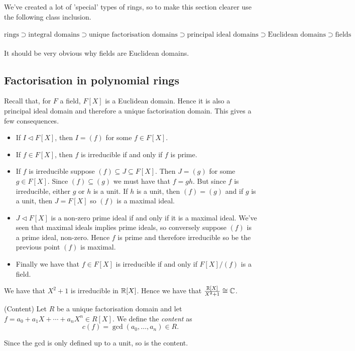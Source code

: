 \documentclass{article}
\newcommand{\nrm}{\triangleleft}
\begin{document}
\begin{itemize}
\\\\ We've created a lot of 'special' types of rings, so to make this section clearer use the following class inclusion.\\\\
$
	\text{rings} \supset \text{integral domains}\supset\text{unique factorisation domains} \supset \text{principal ideal domains}\supset \text{Euclidean domains} \supset \text{fields}
$\\\\
It should be very obvious why fields are Euclidean domains.
\subsection{Factorisation in polynomial rings}
Recall that, for $ F $ a field, $ F[X] $ is a Euclidean domain. Hence it is also a principal ideal domain and therefore a unique factorisation domain. This gives a few consequences.
\begin{itemize}
	\item If $ I\nrm F[X] $, then $ I=(f) $ for some $ f\in F[X] $.
	\item If $ f\in F[X] $, then $ f $ is irreducible if and only if $ f $ is prime.
	\item If $ f $ is irreducible suppose $ (f)\subseteq J\subseteq F[X] $. Then $ J=(g) $ for some $ g\in F[X] $. Since $ (f)\subseteq (g) $ we must have that $ f=gh $. But since $ f $ is irreducible, either $ g $ or $ h $ is a unit. If $ h $ is a unit, then $ (f)=(g) $ and if $ g $ is a unit, then $ J=F[X] $ so $ (f) $ is a maximal ideal.
	\item $ J\nrm F[X] $ is a non-zero prime ideal if and only if it is a maximal ideal. We've seen that maximal ideals implies prime ideals, so conversely suppose $ (f) $ is a prime ideal, non-zero. Hence $ f $ is prime and therefore irreducible so be the previous point $ (f) $ is maximal.
	\item Finally we have that $ f\in F[X] $ is irreducible if and only if $ F[X]/(f) $ is a field.
\end{itemize} 
We have that $ X^2+1 $ is irreducible in $ \mathbb{R}[X] $. Hence we have that $ \frac{\mathbb{R}[X]}{X^2+1}\cong\mathbb{C} $.
\begin{definition}
	(Content) Let $ R $ be a unique factorisation domain and let $ f=a_0+a_1X+\cdots+a_nX^n\in R[X] $. We define the \textit{content} as
	\[
	  c(f)=\gcd(a_0,\dots,a_n)\in R.
	\]
\end{definition}
Since the gcd is only defined up to a unit, so is the content.

\end{itemize}
\end{document}
